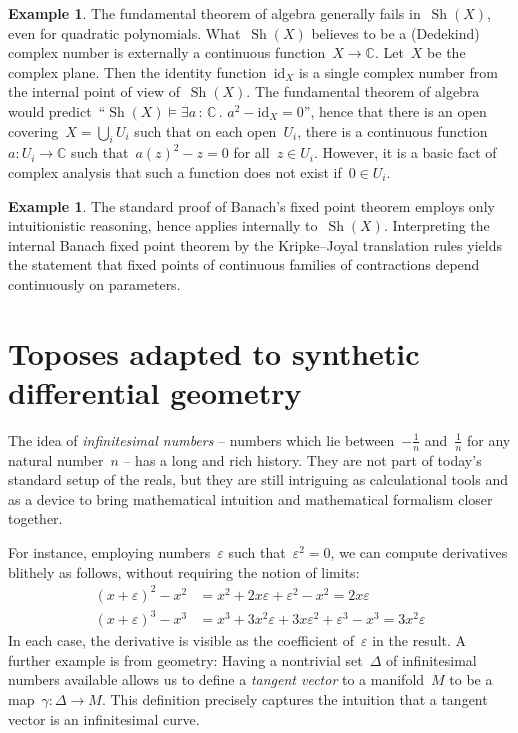 \documentclass[oneside,reqno]{amsart}
\theoremstyle{definition}
\newtheorem{ex}[defn]{Example}
\theoremstyle{plain}
\theoremstyle{remark}
\newcommand{\CC}{\mathbb{C}}
\DeclareMathOperator{\Sh}{Sh}
\renewcommand{\_}{\mathpunct{.}\,}
\newcommand{\?}{\,{:}\,}
\begin{document}
\begin{ex}The fundamental theorem of algebra generally fails in~$\Sh(X)$, even
for quadratic polynomials. What~$\Sh(X)$ believes to be a (Dedekind)
complex number is externally a continuous function~$X \to \CC$. Let~$X$ be the
complex plane. Then the identity function~$\mathrm{id}_X$ is a single complex number from the
internal point of view of~$\Sh(X)$. The fundamental theorem of algebra would
predict~``$\Sh(X) \models \exists a\?\CC\_ a^2 - \mathrm{id}_X = 0$'',
hence that there is an open covering~$X = \bigcup_i U_i$ such that on each
open~$U_i$, there is a continuous function~$a : U_i \to \CC$ such that~$a(z)^2
- z = 0$ for all~$z \in U_i$. However, it is a basic fact of complex analysis
that such a function does not exist if~$0 \in U_i$.
\end{ex}

\begin{ex}The standard proof of Banach's fixed point theorem employs only
intuitionistic reasoning, hence applies internally to~$\Sh(X)$. Interpreting the
internal Banach fixed point theorem by the Kripke--Joyal translation rules
yields the statement that fixed points of continuous families of contractions
depend continuously on parameters.
\end{ex}


\section{Toposes adapted to synthetic differential geometry}
\label{sect:smooth}

The idea of \emph{infinitesimal numbers} -- numbers which lie between~$-\frac{1}{n}$
and~$\frac{1}{n}$ for any natural number~$n$ -- has a long and rich history. They are
not part of today's standard setup of the reals, but they are still intriguing
as calculational tools and as a device to bring mathematical intuition and
mathematical formalism closer together.

For instance, employing numbers~$\varepsilon$ such that~$\varepsilon^2 = 0$, we can
compute derivatives blithely as follows, without requiring the notion of
limits:
\begin{equation}\label{eq:derivative}\tag{$\star$}
  \begin{aligned}
    (x + \varepsilon)^2 - x^2 &= x^2 + 2x\varepsilon + \varepsilon^2 - x^2 = 2x\varepsilon \\
    (x + \varepsilon)^3 - x^3 &= x^3 + 3x^2\varepsilon + 3x\varepsilon^2 + \varepsilon^3 - x^3 = 3x^2\varepsilon
  \end{aligned}
\end{equation}
In each case, the derivative is visible as the coefficient of~$\varepsilon$ in
the result. A further example is from geometry: Having a nontrivial
set~$\Delta$ of infinitesimal numbers available allows us to define a
\emph{tangent vector} to a manifold~$M$ to be a map~$\gamma : \Delta \to M$. This
definition precisely captures the intuition that a tangent vector is an
infinitesimal curve.
\end{document}
